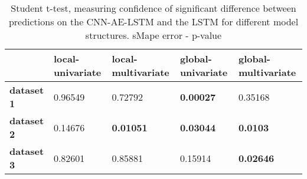 \begin{table}[H]
\centering
\caption{Student t-test, measuring confidence of significant difference between predictions on the CNN-AE-LSTM and the LSTM for different model structures. sMape error - p-value}
\label{table:ttest-p-values-main-experiments-sMAPE}
\begin{tabular}{lllll}
\toprule
{} & local-univariate & local-multivariate & global-univariate & global-multivariate \\
\midrule
\textbf{dataset 1} &          0.96549 &            0.72792 &  \textbf{0.00027} &             0.35168 \\
\textbf{dataset 2} &          0.14676 &   \textbf{0.01051} &  \textbf{0.03044} &     \textbf{0.0103} \\
\textbf{dataset 3} &          0.82601 &            0.85881 &           0.15914 &    \textbf{0.02646} \\
\bottomrule
\end{tabular}
\end{table}

